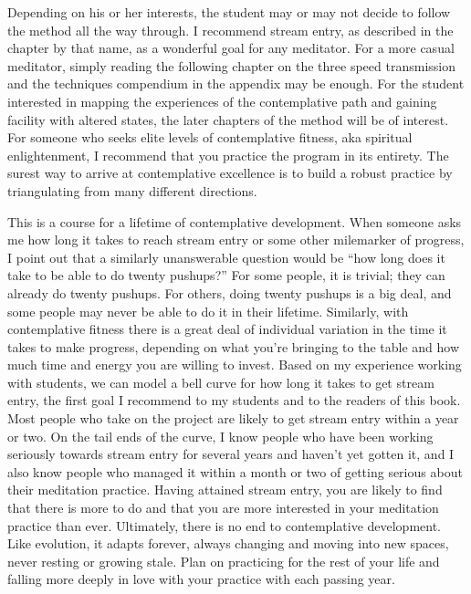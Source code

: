 \documentclass[a5paper,10pt,english]{book}
\begin{document}
\sphinxAtStartPar
Depending on his or her interests, the student may or may not decide to
follow the method all the way through. I recommend stream entry, as
described in the chapter by that name, as a wonderful goal for any
meditator. For a more casual meditator, simply reading the following
chapter on the three speed transmission and the techniques compendium in
the appendix may be enough. For the student interested in mapping the
experiences of the contemplative path and gaining facility with altered
states, the later chapters of the method will be of interest. For
someone who seeks elite levels of contemplative fitness, aka spiritual
enlightenment, I recommend that you practice the program in its
entirety. The surest way to arrive at contemplative excellence is to
build a robust practice by triangulating from many different directions.

\sphinxAtStartPar
This is a course for a lifetime of contemplative development. When
someone asks me how long it takes to reach stream entry or some other
mile\sphinxhyphen{}marker of progress, I point out that a similarly unanswerable
question would be “how long does it take to be able to do twenty
pushups?” For some people, it is trivial; they can already do twenty
pushups. For others, doing twenty pushups is a big deal, and some people
may never be able to do it in their lifetime. Similarly, with
contemplative fitness there is a great deal of individual variation in
the time it takes to make progress, depending on what you’re bringing to
the table and how much time and energy you are willing to invest. Based
on my experience working with students, we can model a bell curve for
how long it takes to get stream entry, the first goal I recommend to my
students and to the readers of this book. Most people who take on the
project are likely to get stream entry within a year or two. On the tail
ends of the curve, I know people who have been working seriously towards
stream entry for several years and haven’t yet gotten it, and I also
know people who managed it within a month or two of getting serious
about their meditation practice. Having attained stream entry, you are
likely to find that there is more to do and that you are more interested
in your meditation practice than ever. Ultimately, there is no end to
contemplative development. Like evolution, it adapts forever, always
changing and moving into new spaces, never resting or growing stale.
Plan on practicing for the rest of your life and falling more deeply in
love with your practice with each passing year.
\end{document}
